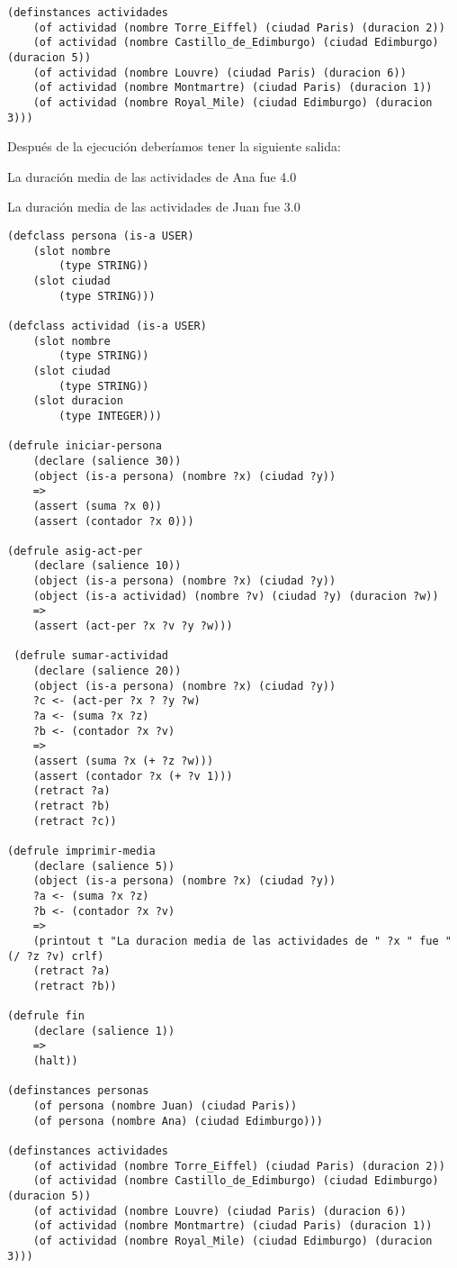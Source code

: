 \documentclass[12pt, spanish, pdftex]{UC3M_document}
\begin{document}
\begin{enumerate}
\begin{lstlisting}
(definstances actividades
    (of actividad (nombre Torre_Eiffel) (ciudad Paris) (duracion 2))
    (of actividad (nombre Castillo_de_Edimburgo) (ciudad Edimburgo) (duracion 5))
    (of actividad (nombre Louvre) (ciudad Paris) (duracion 6))
    (of actividad (nombre Montmartre) (ciudad Paris) (duracion 1))
    (of actividad (nombre Royal_Mile) (ciudad Edimburgo) (duracion 3)))
\end{lstlisting}
	      Después de la ejecución deberíamos tener la siguiente salida:

	      La duración media de las actividades de Ana fue 4.0

	      La duración media de las actividades de Juan fue 3.0
	      \begin{lstlisting}
(defclass persona (is-a USER)
    (slot nombre
        (type STRING))
    (slot ciudad
        (type STRING)))

(defclass actividad (is-a USER)
    (slot nombre
        (type STRING))
    (slot ciudad
        (type STRING))
    (slot duracion
        (type INTEGER)))

(defrule iniciar-persona
    (declare (salience 30))
    (object (is-a persona) (nombre ?x) (ciudad ?y))
    =>
    (assert (suma ?x 0))
    (assert (contador ?x 0)))

(defrule asig-act-per
    (declare (salience 10))
    (object (is-a persona) (nombre ?x) (ciudad ?y))
    (object (is-a actividad) (nombre ?v) (ciudad ?y) (duracion ?w))
    =>
    (assert (act-per ?x ?v ?y ?w)))

 (defrule sumar-actividad
    (declare (salience 20))
    (object (is-a persona) (nombre ?x) (ciudad ?y))
    ?c <- (act-per ?x ? ?y ?w)
    ?a <- (suma ?x ?z)
    ?b <- (contador ?x ?v)
    =>
    (assert (suma ?x (+ ?z ?w)))
    (assert (contador ?x (+ ?v 1)))
    (retract ?a)
    (retract ?b)
    (retract ?c)) 

(defrule imprimir-media
    (declare (salience 5))
    (object (is-a persona) (nombre ?x) (ciudad ?y))
    ?a <- (suma ?x ?z)
    ?b <- (contador ?x ?v)
    =>
    (printout t "La duracion media de las actividades de " ?x " fue " (/ ?z ?v) crlf)
    (retract ?a)
    (retract ?b))

(defrule fin
    (declare (salience 1))
    =>
    (halt))

(definstances personas
    (of persona (nombre Juan) (ciudad Paris))
    (of persona (nombre Ana) (ciudad Edimburgo)))

(definstances actividades
    (of actividad (nombre Torre_Eiffel) (ciudad Paris) (duracion 2))
    (of actividad (nombre Castillo_de_Edimburgo) (ciudad Edimburgo) (duracion 5))
    (of actividad (nombre Louvre) (ciudad Paris) (duracion 6))
    (of actividad (nombre Montmartre) (ciudad Paris) (duracion 1))
    (of actividad (nombre Royal_Mile) (ciudad Edimburgo) (duracion 3)))
\end{lstlisting}
	      \pagebreak


\end{enumerate}
\end{document}

